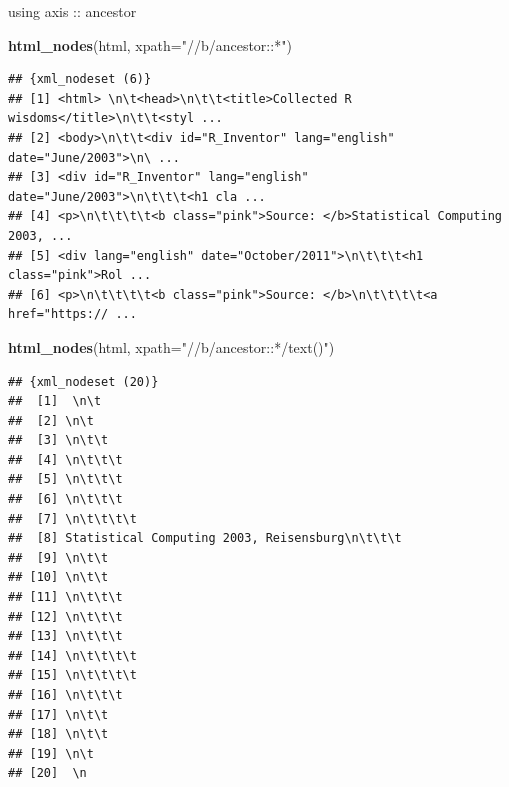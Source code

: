 \documentclass[ignorenonframetext,]{beamer}
\newenvironment{Shaded}{\begin{snugshade}}{\end{snugshade}}
\newcommand{\KeywordTok}[1]{\textcolor[rgb]{0.13,0.29,0.53}{\textbf{{#1}}}}
\newcommand{\DataTypeTok}[1]{\textcolor[rgb]{0.13,0.29,0.53}{{#1}}}
\newcommand{\StringTok}[1]{\textcolor[rgb]{0.31,0.60,0.02}{{#1}}}
\newcommand{\NormalTok}[1]{{#1}}
\begin{document}
\begin{frame}[fragile]{using axis :: ancestor}

\begin{Shaded}
\begin{Highlighting}[]
\KeywordTok{html_nodes}\NormalTok{(html, }\DataTypeTok{xpath=}\StringTok{"//b/ancestor::*"}\NormalTok{)}
\end{Highlighting}
\end{Shaded}

\begin{verbatim}
## {xml_nodeset (6)}
## [1] <html> \n\t<head>\n\t\t<title>Collected R wisdoms</title>\n\t\t<styl ...
## [2] <body>\n\t\t<div id="R_Inventor" lang="english" date="June/2003">\n\ ...
## [3] <div id="R_Inventor" lang="english" date="June/2003">\n\t\t\t<h1 cla ...
## [4] <p>\n\t\t\t\t<b class="pink">Source: </b>Statistical Computing 2003, ...
## [5] <div lang="english" date="October/2011">\n\t\t\t<h1 class="pink">Rol ...
## [6] <p>\n\t\t\t\t<b class="pink">Source: </b>\n\t\t\t\t<a href="https:// ...
\end{verbatim}

\begin{Shaded}
\begin{Highlighting}[]
\KeywordTok{html_nodes}\NormalTok{(html, }\DataTypeTok{xpath=}\StringTok{"//b/ancestor::*/text()"}\NormalTok{)}
\end{Highlighting}
\end{Shaded}

\begin{verbatim}
## {xml_nodeset (20)}
##  [1]  \n\t
##  [2] \n\t
##  [3] \n\t\t
##  [4] \n\t\t\t
##  [5] \n\t\t\t
##  [6] \n\t\t\t
##  [7] \n\t\t\t\t
##  [8] Statistical Computing 2003, Reisensburg\n\t\t\t
##  [9] \n\t\t
## [10] \n\t\t
## [11] \n\t\t\t
## [12] \n\t\t\t
## [13] \n\t\t\t
## [14] \n\t\t\t\t
## [15] \n\t\t\t\t
## [16] \n\t\t\t
## [17] \n\t\t
## [18] \n\t\t
## [19] \n\t
## [20]  \n
\end{verbatim}

\end{frame}
\end{document}
